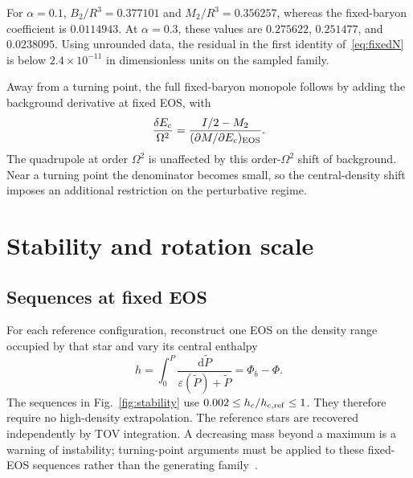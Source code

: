 \documentclass[aps,prd,reprint,a4paper,nofootinbib,floatfix]{revtex4-2}
\newcommand{\dd}{\mathrm d}
\begin{document}
For $\alpha=0.1$, $B_2/R^3=0.377101$ and $M_2/R^3=0.356257$, whereas the fixed-baryon coefficient is $0.0114943$. At $\alpha=0.3$, these values are $0.275622$, $0.251477$, and $0.0238095$. Using unrounded data, the residual in the first identity of~\eqref{eq:fixedN} is below $2.4\times10^{-11}$ in dimensionless units on the sampled family.

Away from a turning point, the full fixed-baryon monopole follows by adding the background derivative at fixed EOS, with
\begin{equation}
 \frac{\delta E_c}{\Omega^2}=
 \frac{I/2-M_2}{(\partial M/\partial E_c)_{\rm EOS}}.
\end{equation}
The quadrupole at order $\Omega^2$ is unaffected by this order-$\Omega^2$ shift of background. Near a turning point the denominator becomes small, so the central-density shift imposes an additional restriction on the perturbative regime.

\section{Stability and rotation scale}
\subsection{Sequences at fixed EOS}
For each reference configuration, reconstruct one EOS on the density range occupied by that star and vary its central enthalpy
\begin{equation}
 h=\int_0^P\frac{\dd\widetilde P}{\varepsilon(\widetilde P)+\widetilde P}
   =\Phi_b-\Phi.
\end{equation}
The sequences in Fig.~\ref{fig:stability} use $0.002\le h_c/h_{c,\rm ref}\le1$. They therefore require no high-density extrapolation. The reference stars are recovered independently by TOV integration. A decreasing mass beyond a maximum is a warning of instability; turning-point arguments must be applied to these fixed-EOS sequences rather than the generating family~\cite{btm,fis}.
\end{document}
